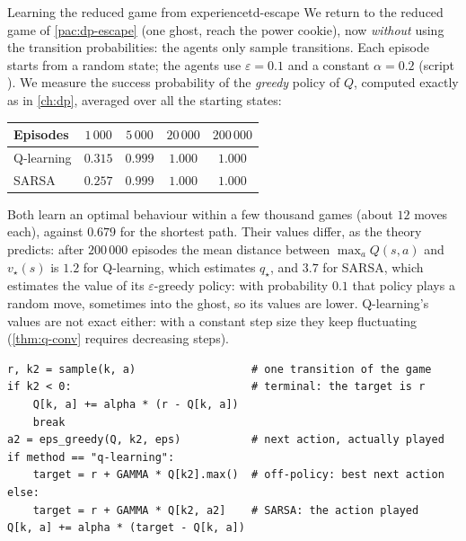 \begin{pacman}{Learning the reduced game from experience}{td-escape}
  We return to the reduced game of \cref{pac:dp-escape} (one ghost, reach
  the power cookie), now \emph{without} using the transition probabilities:
  the agents only sample transitions. Each episode starts from a random
  state; the agents use $\varepsilon = 0.1$ and a constant $\alpha = 0.2$
  (script ). We measure the success
  probability of the \emph{greedy} policy of $Q$, computed exactly as in
  \cref{ch:dp}, averaged over all the starting states:
  \begin{center}
    \begin{tabular}{@{}lcccc@{}}
      \toprule
      Episodes & $1\,000$ & $5\,000$ & $20\,000$ & $200\,000$ \\
      \midrule
      Q-learning & $0.315$ & $0.999$ & $1.000$ & $1.000$ \\
      SARSA & $0.257$ & $0.999$ & $1.000$ & $1.000$ \\
      \bottomrule
    \end{tabular}
  \end{center}
  Both learn an optimal behaviour within a few thousand games (about
  $12$ moves each), against $0.679$ for the shortest path. Their values
  differ, as the theory predicts: after $200\,000$ episodes the mean
  distance between $\max_a Q(s, a)$ and $v_\star(s)$ is $1.2$ for
  Q-learning, which estimates $q_\star$, and $3.7$ for SARSA, which
  estimates the value of its $\varepsilon$-greedy policy: with
  probability $0.1$ that policy plays a random move, sometimes into the
  ghost, so its values are lower. Q-learning's values are not exact either:
  with a constant step size they keep fluctuating
  (\cref{thm:q-conv} requires decreasing steps).
\end{pacman}

\begin{lstlisting}[caption={The SARSA and Q-learning updates
  (\code{Course/code/td\_escape.py}, excerpt)}]
r, k2 = sample(k, a)                  # one transition of the game
if k2 < 0:                            # terminal: the target is r
    Q[k, a] += alpha * (r - Q[k, a])
    break
a2 = eps_greedy(Q, k2, eps)           # next action, actually played
if method == "q-learning":
    target = r + GAMMA * Q[k2].max()  # off-policy: best next action
else:
    target = r + GAMMA * Q[k2, a2]    # SARSA: the action played
Q[k, a] += alpha * (target - Q[k, a])
\end{lstlisting}

